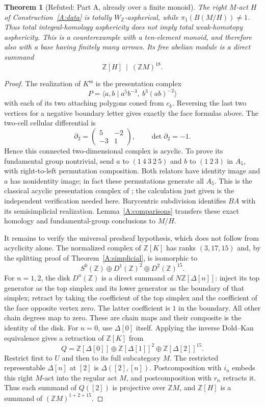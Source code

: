 \documentclass[11pt,a4paper]{article}
\newtheorem{theorem}{Theorem}[section]
\theoremstyle{definition}
\theoremstyle{remark}
\newcommand{\Z}{\mathbb Z}
\newcommand{\WZ}{W_{\mathbb Z}}
\begin{document}
\begin{theorem}[Refuted: Part A, already over a finite monoid]\label{A:counterexample}
The right $M$-act $H$ of Construction~\ref{A:data} is totally $\WZ$-aspherical, while $\pi_1(B(M/H))\ne1$. Thus total integral-homology asphericity does not imply total weak-homotopy asphericity. This is a counterexample with a ten-element monoid, and therefore also with a base having finitely many arrows. Its free abelian module is a direct summand
\[
 \Z[H]\ \mid\ (\Z M)^{18}.
\]
\end{theorem}
\begin{proof}
The realization of $K^{\mathrm{ss}}$ is the presentation complex
\[
 P=\langle a,b\mid a^5b^{-3},\ b^3(ab)^{-2}\rangle
\]
with each of its two attaching polygons coned from $c_k$. Reversing the last two vertices for a negative boundary letter gives exactly the face formulas above. The two-cell cellular differential is
\[
 \partial_2=\begin{pmatrix}5&-2\\-3&1\end{pmatrix},
 \qquad\det\partial_2=-1.
\]
Hence this connected two-dimensional complex is acyclic. To prove its fundamental group nontrivial, send $a$ to $(1\ 4\ 3\ 2\ 5)$ and $b$ to $(1\ 2\ 3)$ in $A_5$, with right-to-left permutation composition. Both relators have identity image and $a$ has nonidentity image; in fact these permutations generate all $A_5$. This is the classical acyclic presentation complex of \citet[Example 2.38, p.~142]{Hatcher2002}; the calculation just given is the independent verification needed here. Barycentric subdivision identifies $BA$ with its semisimplicial realization. Lemma~\ref{A:comparisons} transfers these exact homology and fundamental-group conclusions to $M/H$.

It remains to verify the universal presheaf hypothesis, which does not follow from acyclicity alone. The normalized complex of $\Z[K]$ has ranks $(3,17,15)$ and, by the splitting proof of Theorem~\ref{A:simplicial}, is isomorphic to
\[
 S^0(\Z)\oplus D^1(\Z)^2\oplus D^2(\Z)^{15}.
\]
For $n=1,2$, the disk $D^n(\Z)$ is a direct summand of $N\Z[\Delta[n]]$: inject its top generator as the top simplex and its lower generator as the boundary of that simplex; retract by taking the coefficient of the top simplex and the coefficient of the face opposite vertex zero. The latter coefficient is $1$ in the boundary. All other chain degrees map to zero. These are chain maps and their composite is the identity of the disk. For $n=0$, use $\Delta[0]$ itself. Applying the inverse Dold--Kan equivalence gives a retraction of $\Z[K]$ from
\[
 Q=\Z[\Delta[0]]\oplus\Z[\Delta[1]]^2\oplus\Z[\Delta[2]]^{15}.
\]
Restrict first to $U$ and then to its full subcategory $M$. The restricted representable $\Delta[n]$ at $[2]$ is $\Delta([2],[n])$. Postcomposition with $i_n$ embeds this right $M$-act into the regular act $M$, and postcomposition with $r_n$ retracts it. Thus each summand of $Q([2])$ is projective over $\Z M$, and $\Z[H]$ is a summand of $(\Z M)^{1+2+15}$.


\end{proof}
\end{document}
